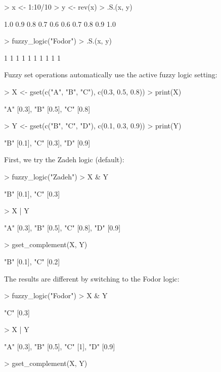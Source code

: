 \documentclass[article]{jss}
\begin{document}
\begin{Schunk}
\begin{Sinput}
> x <- 1:10/10
> y <- rev(x)
> .S.(x, y)
\end{Sinput}
\begin{Soutput}
 [1] 1.0 0.9 0.8 0.7 0.6 0.6 0.7 0.8 0.9 1.0
\end{Soutput}
\begin{Sinput}
> fuzzy_logic("Fodor")
> .S.(x, y)
\end{Sinput}
\begin{Soutput}
 [1] 1 1 1 1 1 1 1 1 1 1
\end{Soutput}
\end{Schunk}
Fuzzy set operations automatically use the active fuzzy logic setting:
\begin{Schunk}
\begin{Sinput}
> X <- gset(c("A", "B", "C"), c(0.3, 0.5, 0.8))
> print(X)
\end{Sinput}
\begin{Soutput}
{"A" [0.3], "B" [0.5], "C" [0.8]}
\end{Soutput}
\begin{Sinput}
> Y <- gset(c("B", "C", "D"), c(0.1, 0.3, 0.9))
> print(Y)
\end{Sinput}
\begin{Soutput}
{"B" [0.1], "C" [0.3], "D" [0.9]}
\end{Soutput}
\end{Schunk}
First, we try the Zadeh logic (default):
\begin{Schunk}
\begin{Sinput}
> fuzzy_logic("Zadeh")
> X & Y
\end{Sinput}
\begin{Soutput}
{"B" [0.1], "C" [0.3]}
\end{Soutput}
\begin{Sinput}
> X | Y
\end{Sinput}
\begin{Soutput}
{"A" [0.3], "B" [0.5], "C" [0.8], "D" [0.9]}
\end{Soutput}
\begin{Sinput}
> gset_complement(X, Y)
\end{Sinput}
\begin{Soutput}
{"B" [0.1], "C" [0.2]}
\end{Soutput}
\end{Schunk}
The results are different by switching to the Fodor logic:
\begin{Schunk}
\begin{Sinput}
> fuzzy_logic("Fodor")
> X & Y
\end{Sinput}
\begin{Soutput}
{"C" [0.3]}
\end{Soutput}
\begin{Sinput}
> X | Y
\end{Sinput}
\begin{Soutput}
{"A" [0.3], "B" [0.5], "C" [1], "D" [0.9]}
\end{Soutput}
\begin{Sinput}
> gset_complement(X, Y)
\end{Sinput}
\begin{Soutput}
{}
\end{Soutput}
\end{Schunk}
\end{document}
